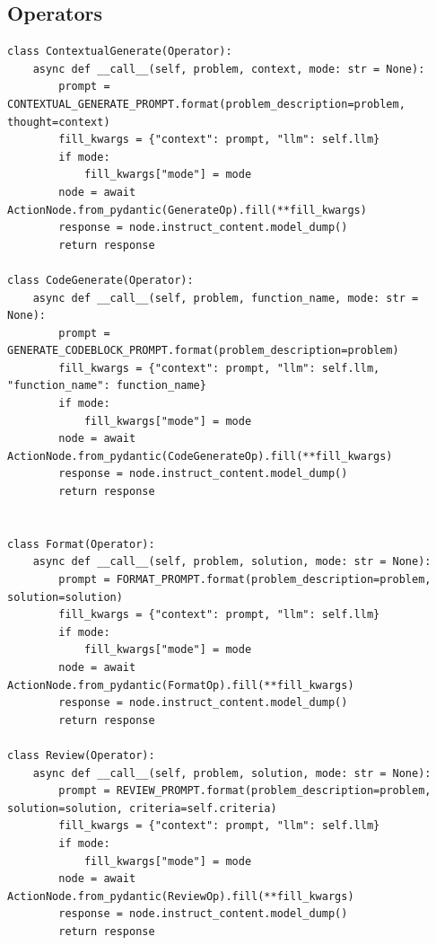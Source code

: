 \subsection{Operators}
\label{appendix:operator_code}
\begin{tcolorbox}[title={\textbf{\small Operators}}, boxrule=1pt, arc=0mm, colback=black!5!white, colframe=black!75!white, breakable, before skip=10pt, after skip=10pt, pad at break=2mm, parbox=false] \begin{verbatim}
class ContextualGenerate(Operator):
    async def __call__(self, problem, context, mode: str = None):
        prompt = CONTEXTUAL_GENERATE_PROMPT.format(problem_description=problem, thought=context)
        fill_kwargs = {"context": prompt, "llm": self.llm}
        if mode:
            fill_kwargs["mode"] = mode
        node = await ActionNode.from_pydantic(GenerateOp).fill(**fill_kwargs)
        response = node.instruct_content.model_dump()
        return response

class CodeGenerate(Operator):
    async def __call__(self, problem, function_name, mode: str = None):
        prompt = GENERATE_CODEBLOCK_PROMPT.format(problem_description=problem)
        fill_kwargs = {"context": prompt, "llm": self.llm, "function_name": function_name}
        if mode:
            fill_kwargs["mode"] = mode
        node = await ActionNode.from_pydantic(CodeGenerateOp).fill(**fill_kwargs)
        response = node.instruct_content.model_dump()
        return response


class Format(Operator):
    async def __call__(self, problem, solution, mode: str = None):
        prompt = FORMAT_PROMPT.format(problem_description=problem, solution=solution)
        fill_kwargs = {"context": prompt, "llm": self.llm}
        if mode:
            fill_kwargs["mode"] = mode
        node = await ActionNode.from_pydantic(FormatOp).fill(**fill_kwargs)
        response = node.instruct_content.model_dump()
        return response
        
class Review(Operator):
    async def __call__(self, problem, solution, mode: str = None):
        prompt = REVIEW_PROMPT.format(problem_description=problem, solution=solution, criteria=self.criteria)
        fill_kwargs = {"context": prompt, "llm": self.llm}
        if mode:
            fill_kwargs["mode"] = mode
        node = await ActionNode.from_pydantic(ReviewOp).fill(**fill_kwargs)
        response = node.instruct_content.model_dump()
        return response


\end{verbatim}
\end{tcolorbox}
